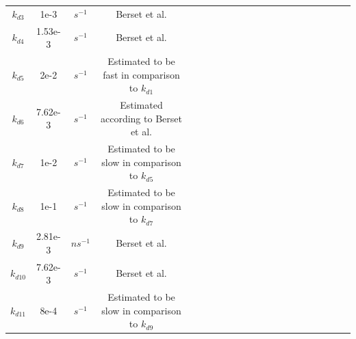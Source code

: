 \begin{table}[htbp]
\begin{tabular}{ccccccccccccccccccccc}
		$k_{d3}$&1e-3&$s^{-1} $ & Berset et al.\\
		$k_{d4}$&1.53e-3&$s^{-1} $  & Berset et al.\\
		$k_{d5} $& 2e-2&$s^{-1} $& Estimated to be fast in comparison to $k_{d1}$\\
		$k_{d6}$&7.62e-3&$s^{-1} $&  Estimated according to Berset et al.\\
		$k_{d7}$& 1e-2&$s^{-1} $&  Estimated to be slow in comparison to $k_{d5}$ \\
		$k_{d8}$&1e-1&$s^{-1} $&  Estimated to be slow in comparison to $k_{d7}$ \\
		$k_{d9}$&2.81e-3  & $ns^{-1}$ & Berset et al.  \\
		$k_{d10} $ &7.62e-3 &$s^{-1}$ & Berset et al. \\
		$k_{d11}$& 8e-4& $s^{-1}$& Estimated to be slow in comparison to $k_{d9}$ \\
		\bottomrule
	\end{tabular}
\end{table}
